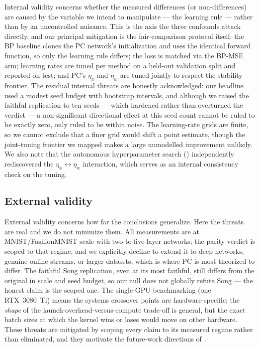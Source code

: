 Internal validity concerns whether the measured differences (or non-differences) are caused by the
variable we intend to manipulate --- the learning rule --- rather than by an uncontrolled nuisance.
This is the axis the three confounds attack directly, and our principal mitigation is the
fair-comparison protocol itself: the BP baseline clones the PC network's initialization and uses the
identical forward function, so only the learning rule differs; the loss is matched via the BP-MSE
arm; learning rates are tuned per method on a held-out validation split and reported on test; and
PC's $\eta_x$ and $\eta_w$ are tuned jointly to respect the stability frontier. The residual internal
threats are honestly acknowledged: our headline used a modest seed budget with bootstrap intervals,
and although we raised the faithful replication to ten seeds --- which hardened rather than
overturned the verdict --- a non-significant directional effect at this seed count cannot be ruled to
be exactly zero, only ruled to be within noise. The learning-rate grids are finite, so we cannot
exclude that a finer grid would shift a point estimate, though the joint-tuning frontier we mapped
makes a large unmodelled improvement unlikely. We also note that the autonomous hyperparameter search
() independently rediscovered the $\eta_x \leftrightarrow \eta_w$ interaction,
which serves as an internal consistency check on the tuning.

\subsection{External validity}

External validity concerns how far the conclusions generalize. Here the threats are real and we do
not minimize them. All measurements are at MNIST/FashionMNIST scale with two-to-five-layer networks;
the parity verdict is scoped to that regime, and we explicitly decline to extend it to deep networks,
genuine online streams, or larger datasets, which is where PC is most theorized to differ. The
faithful Song replication, even at its most faithful, still differs from the original in scale and
seed budget, so our null does not globally refute Song --- the honest claim is the scoped one. The
single-GPU benchmarking (one RTX~3080~Ti) means the systems crossover points are hardware-specific;
the \emph{shape} of the launch-overhead-versus-compute trade-off is general, but the exact batch
sizes at which the kernel wins or loses would move on other hardware. These threats are mitigated by
scoping every claim to its measured regime rather than eliminated, and they motivate the future-work
directions of .

